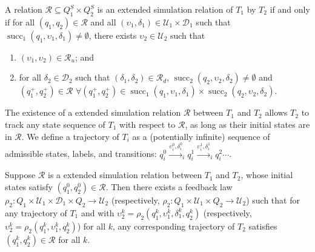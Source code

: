 \begin{definition}
  \label{thm:ex-simulation-relation}
  A relation $\mathcal{R} \subseteq Q^{S}_1 \times Q^{S}_2$ is an extended simulation relation of $T_1$ by $T_2$ if and only if for all $(q_1, q_2) \in \mathcal{R}$ and all $(\upsilon_{1}, \delta_{1}) \in \mathcal{U}_{1} \times \mathcal{D}_{1}$ such that $\operatorname{succ}_{1} (q_{1}, \upsilon_{1}, \delta_{1}) \neq \emptyset$, there exists $\upsilon_{2} \in \mathcal{U}_{2}$ such that
    \begin{enumerate}
    \item $(\upsilon_{1}, \upsilon_{2}) \in \mathcal{R}_{u}$; and
    \item for all $\delta_{2} \in \mathcal{D}_{2}$ such that $(\delta_{1}, \delta_{2}) \in \mathcal{R}_{d}$, $\operatorname{succ}_{2} (q_{2}, \upsilon_{2}, \delta_{2}) \neq \emptyset$ and $(q_{1}^{+}, q_{2}^{+}) \in \mathcal{R}$ %
      $\forall (q_{1}^{+}, q_{2}^{+}) \in \operatorname{succ}_{1} (q_{1}, \upsilon_{1}, \delta_{1}) \times \operatorname{succ}_{2} (q_{2}, \upsilon_{2}, \delta_{2})$.
    \end{enumerate}
\end{definition}


The existence of a extended simulation relation $\mathcal{R}$ between $T_{1}$ and $T_{2}$ allows $T_{2}$ to track any state sequence of $T_{1}$ with respect to $\mathcal{R}$, as long as their initial states are in $\mathcal{R}$.
We define a trajectory of $T_{i}$ as a (potentially infinite) sequence of admissible states, labels, and transitions: $q_{i}^{0} \xrightarrow{\upsilon_{i}^{0}, \delta_{i}^{0}}_{i} q_{i}^{1} \xrightarrow{\upsilon_{i}^{1}, \delta_{i}^{1}}_{i} q_{i}^{2} \cdots$.


\begin{theorem}
  Suppose $\mathcal{R}$ is a extended simulation relation between $T_{1}$ and $T_{2}$, whose initial states satisfy $(q_{1}^{0}, q_{2}^{0}) \in \mathcal{R}$.
  Then there exists a feedback law $\rho_{2}: Q_{1} \times \mathcal{U}_{1} \times \mathcal{D}_{1} \times Q_{2} \to \mathcal{U}_{2}$ (respectively, $\rho_{2}: Q_{1} \times \mathcal{U}_{1} \times Q_{2} \to \mathcal{U}_{2}$) such that for any trajectory of $T_{1}$ and with $\upsilon_{2}^{k} = \rho_{2} (q_{1}^{k}, \upsilon_{1}^{k}, \delta_{1}^{k}, q_{2}^{k})$ (respectively, $\upsilon_{2}^{k} = \rho_{2} (q_{1}^{k}, \upsilon_{1}^{k}, q_{2}^{k})$) for all $k$, any corresponding trajectory of $T_{2}$ satisfies $(q_{1}^{k}, q_{2}^{k}) \in \mathcal{R}$ for all $k$.
\end{theorem}



